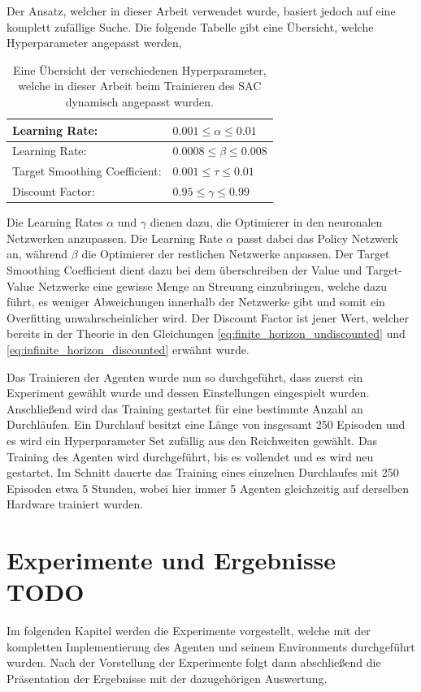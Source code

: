 \documentclass[]{iat}
\begin{document}
Der Ansatz, welcher in dieser Arbeit verwendet wurde, basiert jedoch auf eine komplett zufällige Suche. Die folgende Tabelle gibt eine Übersicht, welche Hyperparameter angepasst werden,
\begin{table}[H]
    \begin{tabular}{l|l}
        Learning Rate:                & $0.001 \leq \alpha \leq 0.01$  \\ \hline
        Learning Rate:                & $0.0008 \leq \beta \leq 0.008$ \\ \hline
        Target Smoothing Coefficient: & $0.001 \leq \tau \leq 0.01$    \\ \hline
        Discount Factor:              & $0.95 \leq \gamma \leq 0.99$
    \end{tabular}
    \caption{Eine Übersicht der verschiedenen Hyperparameter, welche in dieser Arbeit beim Trainieren des SAC dynamisch angepasst wurden.}
    \label{tab:hps}
\end{table}
Die Learning Rates $\alpha$ und $\gamma$ dienen dazu, die Optimierer in den neuronalen Netzwerken anzupassen. Die Learning Rate $\alpha$ passt dabei das Policy Netzwerk an, während $\beta$ die Optimierer der restlichen Netzwerke anpassen. Der Target Smoothing Coefficient dient dazu bei dem überschreiben der Value und Target-Value Netzwerke eine gewisse Menge an Streuung einzubringen, welche dazu führt, es weniger Abweichungen innerhalb der Netzwerke gibt und somit ein Overfitting unwahrscheinlicher wird. \cite[]{https://doi.org/10.48550/arxiv.1802.09477} Der Discount Factor ist jener Wert, welcher bereits in der Theorie in den Gleichungen \ref{eq:finite_horizon_undiscounted} und \ref{eq:infinite_horizon_discounted} erwähnt wurde.

Das Trainieren der Agenten wurde nun so durchgeführt, dass zuerst ein Experiment gewählt wurde und dessen Einstellungen eingespielt wurden. Anschließend wird das Training gestartet für eine bestimmte Anzahl an Durchläufen. Ein Durchlauf besitzt eine Länge von insgesamt 250 Episoden und es wird ein Hyperparameter Set zufällig aus den Reichweiten gewählt. Das Training des Agenten wird durchgeführt, bis es vollendet und es wird neu gestartet. Im Schnitt dauerte das Training eines einzelnen Durchlaufes mit 250 Episoden etwa 5 Stunden, wobei hier immer 5 Agenten gleichzeitig auf derselben Hardware trainiert wurden.

\chapter{Experimente und Ergebnisse TODO} \label{sec:ergebnisse}
Im folgenden Kapitel werden die Experimente vorgestellt, welche mit der kompletten Implementierung des Agenten und seinem Environments durchgeführt wurden. Nach der Vorstellung der Experimente folgt dann abschließend die Präsentation der Ergebnisse mit der dazugehörigen Auswertung.
\end{document}
